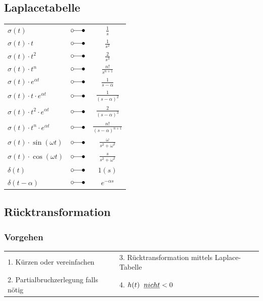 	\subsection{Laplacetabelle}
	\begin{center}
		\begin{tabular}{|lcc|}
		\hline
			$\sigma \left( t \right)$ & $\laplace$ & $\frac{1}{s}$ \\
			$\sigma \left( t \right) \cdot t$ & $\laplace$ & $\frac{1}{s^2}$\\
			$\sigma \left( t \right) \cdot t^2$ & $\laplace$ & $\frac{2}{s^3}$\\
			$\sigma \left( t \right) \cdot t^n$ & $\laplace$ & $\frac{n!}{s^{n+1}}$\\
			$\sigma \left( t \right) \cdot e^{\alpha t}$ & $\laplace$ &
			$\frac{1}{s-\alpha}$\\
			$\sigma \left( t \right) \cdot t \cdot e^{\alpha t}$ & $\laplace$ &
			$\frac{1}{( s - \alpha )^2}$\\
			$\sigma \left( t \right)\cdot t^2 \cdot e^{\alpha t}$ &
			$\laplace$ & $\frac{2}{{( s - \alpha )}^3}$\\
			$\sigma \left( t \right)\cdot t^n \cdot e^{ \alpha t}$ &
			$\laplace$ & $\frac{n!}{(s-\alpha)^{n+1}}$\\
			$\sigma \left( t \right) \cdot \sin \left(\omega t \right)$ & $\laplace$ &
			$\frac{\omega}{s^2 + {\omega^2}}$\\
			$\sigma \left( t \right) \cdot \cos \left( \omega t \right)$ & $\laplace$ &
			$\frac{s}{ s^2 + \omega^2}$\\
			$\delta \left( t \right)$ & $\laplace$ & $1\left( s \right)$ \\
			$\delta \left( t - \alpha \right)$ & $\laplace$ & $e^{- \alpha s}$\\
		\hline
		\end{tabular}
	\end{center}
		
	\subsection{Rücktransformation}
		\subsubsection{Vorgehen}
			\begin{tabular}{p{6cm}p{6cm}}
				1. Kürzen oder vereinfachen &
				3. Rücktransformation mittels Laplace-Tabelle \\
				2. Partialbruchzerlegung falls nötig &
				4. $h(t)\hspace{0.2cm}\underline{nicht} < 0$ \\
			\end{tabular}
			
